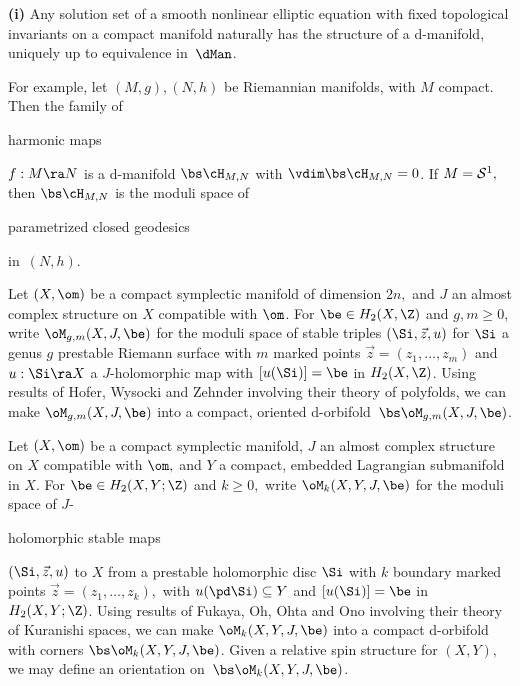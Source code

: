 \documentclass{article}
\begin{document}
\begin{thm}{\bf(i)} Any solution set of a smooth nonlinear elliptic
equation with fixed topological invariants on a compact manifold
naturally has the structure of a d-manifold, uniquely up to
equivalence in\/~$\dMan$.

For example, let\/ $(M,g),(N,h)$ be Riemannian manifolds, with\/ $M$
compact. Then the family of \begin{bfseries}harmonic
maps\end{bfseries}
$f:M\ra N$ is a d-manifold\/ $\bs\cH_{M,N}$ with\/
$\vdim\bs\cH_{M,N}=0$. If\/ $M={\cal S}^1,$ then $\bs\cH_{M,N}$ is
the moduli space of
\begin{bfseries}parametrized closed geodesics\end{bfseries}
in\/~$(N,h)$.
\smallskip

 Let\/ $(X,\om)$ be a
compact symplectic manifold of dimension $2n,$ and\/ $J$ an almost
complex structure on\/ $X$ compatible with\/ $\om$. For\/ $\be\in
H_2(X,\Z)$ and\/ $g,m\ge 0$, write $\oM_{g,m}(X,J,\be)$ for the
moduli space of stable triples $(\Si,\vec z,u)$ for $\Si$ a genus
$g$ prestable Riemann surface with\/ $m$ marked points $\vec
z=(z_1,\ldots,z_m)$ and\/ $u:\Si\ra X$ a $J$-holomorphic map with\/
$[u(\Si)]=\be$ in\/ $H_2(X,\Z)$. Using results of Hofer, Wysocki and
Zehnder\/ {\rm\cite{HWZ6}} involving their theory of
polyfolds, we can make $\oM_{g,m}(X,J,\be)$ into a
compact, oriented d-orbifold\/~$\bs\oM_{g,m}(X,J,\be)$.

\smallskip

 Let\/ $(X,\om)$ be a compact symplectic
manifold, $J$ an almost complex structure on\/ $X$ compatible with\/
$\om,$ and\/ $Y$ a compact, embedded Lagrangian
submanifold in\/ $X$. For\/ $\be\in
H_2(X,Y;\Z)$ and\/ $k\ge 0,$ write $\oM_k(X,Y,J,\be)$ for the moduli
space of $J$-\begin{bfseries}holomorphic stable maps\end{bfseries}
$(\Si,\vec z,u)$ to $X$ from a prestable holomorphic disc $\Si$
with\/ $k$ boundary marked points $\vec z=(z_1,\ldots,z_k),$ with\/
$u(\pd\Si)\subseteq Y$ and\/ $[u(\Si)]=\be$ in $H_2(X,Y;\Z)$. Using
results of Fukaya, Oh, Ohta and Ono\/ {\rm\cite[\S 7--\S 8]{FOOO}}
involving their theory of Kuranishi spaces, we
can make $\oM_k(X,Y,J,\be)$ into a compact d-orbifold with corners\/
$\bs\oM_k(X,Y,J,\be)$. Given a relative spin structure for $(X,Y),$
we may define an orientation on\/~$\bs\oM_k(X,Y,J,\be)$.
\smallskip


\end{thm}
\end{document}
